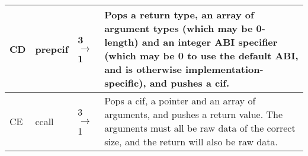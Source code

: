 \begin{longtable}{ | l | l | l | X | }
\hline
CD & prepcif & 3 $\rightarrow$ 1 & Pops a return type, an array of argument types (which may be 0-length) and an integer ABI specifier (which may be 0 to use the default ABI, and is otherwise implementation-specific), and pushes a cif. \\
\hline
CE & ccall & 3 $\rightarrow$ 1 & Pops a cif, a pointer and an array of arguments, and pushes a return value. The arguments must all be raw data of the correct size, and the return will also be raw data. \\
\hline
\end{longtable}

\begin{comment}
0<span style="margin-left:;"/>void (useful for return types)
1<span style="margin-left:;"/>int<br/><span style="margin-left:;"/>2<span style="margin-left:;"/>float<br/><span style="margin-left:;"/>3<span style="margin-left:;"/>double<br/><span style="margin-left:;"/>4<span style="margin-left:;"/>long double<br/><span style="margin-left:;"/>5<span style="margin-left:;"/>unsigned 8-bit int<br/><span style="margin-left:;"/>6<span style="margin-left:;"/>signed 8-bit int<br/><span style="margin-left:;"/>7<span style="margin-left:;"/>unsigned 16-bit int<br/><span style="margin-left:;"/>8<span style="margin-left:;"/>signed 16-bit int<br/><span style="margin-left:;"/>9<span style="margin-left:;"/>unsigned 32-bit int<br/><span style="margin-left:;"/>10<span style="margin-left:;"/>signed 32-bit int<br/><span style="margin-left:;"/>11<span style="margin-left:;"/>unsigned 64-bit int<br/><span style="margin-left:;"/>12<span style="margin-left:;"/>signed 64-bit int
14<span style="margin-left:;"/>pointer (any type)<br/><span style="margin-left:;"/>24<span style="margin-left:;"/>unsigned char<br/><span style="margin-left:;"/>25<span style="margin-left:;"/>signed char<br/><span style="margin-left:;"/>26<span style="margin-left:;"/>unsigned short int<br/><span style="margin-left:;"/>27<span style="margin-left:;"/>signed short int<br/><span style="margin-left:;"/>28<span style="margin-left:;"/>unsigned int<br/><span style="margin-left:;"/>29<span style="margin-left:;"/>signed int<br/><span style="margin-left:;"/>30<span style="margin-left:;"/>unsigned long int<br/><span style="margin-left:;"/>31<span style="margin-left:;"/>signed long int<br/><span style="margin-left:;"/>32<span style="margin-left:;"/>unsigned long long int<br/><span style="margin-left:;"/>33<span style="margin-left:;"/>signed long long int
\end{comment}
